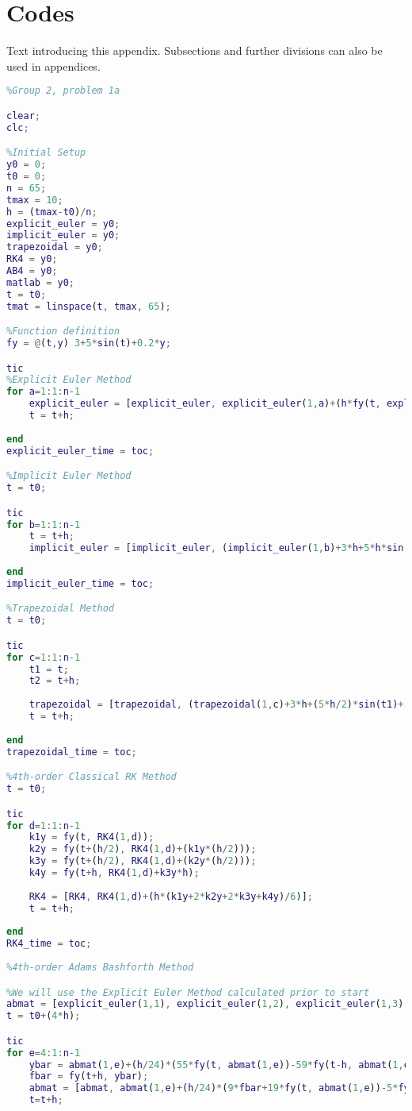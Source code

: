 \documentclass[11pt]{article}
\begin{document}
\section{Codes}\label{S:A}
%
Text introducing this appendix. Subsections and further divisions can also be used 
in appendices. 
\begin{lstlisting}[language=Matlab]
%Brian Danaher
%Group 2, problem 1a

clear;
clc;

%Initial Setup
y0 = 0;
t0 = 0;
n = 65;
tmax = 10;
h = (tmax-t0)/n;
explicit_euler = y0;
implicit_euler = y0;
trapezoidal = y0;
RK4 = y0;
AB4 = y0;
matlab = y0;
t = t0;
tmat = linspace(t, tmax, 65);

%Function definition
fy = @(t,y) 3+5*sin(t)+0.2*y;

tic
%Explicit Euler Method
for a=1:1:n-1
    explicit_euler = [explicit_euler, explicit_euler(1,a)+(h*fy(t, explicit_euler(1,a)))];
    t = t+h;
   
end
explicit_euler_time = toc;

%Implicit Euler Method
t = t0;

tic
for b=1:1:n-1
    t = t+h;
    implicit_euler = [implicit_euler, (implicit_euler(1,b)+3*h+5*h*sin(t))/(1-0.2*h)];
    
end
implicit_euler_time = toc;

%Trapezoidal Method
t = t0;

tic
for c=1:1:n-1
    t1 = t;
    t2 = t+h;
    
    trapezoidal = [trapezoidal, (trapezoidal(1,c)+3*h+(5*h/2)*sin(t1)+(h/10)*trapezoidal(1,c)+(5*h/2)*sin(t2))/(1-h/10)];
    t = t+h;
    
end
trapezoidal_time = toc;

%4th-order Classical RK Method
t = t0;

tic
for d=1:1:n-1   
    k1y = fy(t, RK4(1,d));
    k2y = fy(t+(h/2), RK4(1,d)+(k1y*(h/2)));
    k3y = fy(t+(h/2), RK4(1,d)+(k2y*(h/2)));
    k4y = fy(t+h, RK4(1,d)+k3y*h);
    
    RK4 = [RK4, RK4(1,d)+(h*(k1y+2*k2y+2*k3y+k4y)/6)];
    t = t+h;
    
end
RK4_time = toc;
    
%4th-order Adams Bashforth Method

%We will use the Explicit Euler Method calculated prior to start
abmat = [explicit_euler(1,1), explicit_euler(1,2), explicit_euler(1,3), explicit_euler(1,4)];
t = t0+(4*h);

tic
for e=4:1:n-1  
    ybar = abmat(1,e)+(h/24)*(55*fy(t, abmat(1,e))-59*fy(t-h, abmat(1,e-1))+37*fy(t-2*h, abmat(1,e-2))-9*fy(t-3*h, abmat(1,e-3)));
    fbar = fy(t+h, ybar);
    abmat = [abmat, abmat(1,e)+(h/24)*(9*fbar+19*fy(t, abmat(1,e))-5*fy(t-h, abmat(1,e-1))+fy(t-2*h, abmat(1,e-2)))];
    t=t+h;
    

\end{lstlisting}
\end{document}
